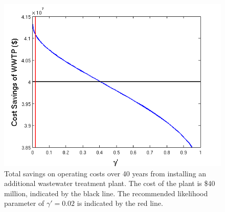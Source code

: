 \documentclass[12pt]{amsart}
\begin{document}
\begin{figure}[!ht]
	\centering
	\includegraphics[width=.7\textwidth]{images/worst_case_cost_savings_3}
	\caption{
		Total savings on operating costs over 40 years from installing an additional wastewater treatment plant.
		The cost of the plant is \$40 million, indicated by the black line.
		The recommended likelihood parameter of $\gamma' = 0.02$ is indicated by the red line.
	}
	\label{fig:worst_case_savings}
\end{figure}
\end{document}

